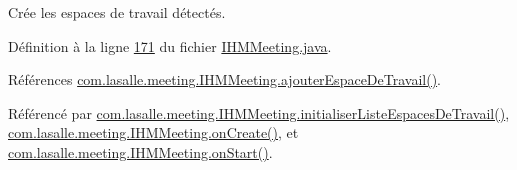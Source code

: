 Crée les espaces de travail détectés. 



Définition à la ligne \hyperlink{_i_h_m_meeting_8java_source_l00171}{171} du fichier \hyperlink{_i_h_m_meeting_8java_source}{I\+H\+M\+Meeting.\+java}.



Références \hyperlink{_i_h_m_meeting_8java_source_l00199}{com.\+lasalle.\+meeting.\+I\+H\+M\+Meeting.\+ajouter\+Espace\+De\+Travail()}.



Référencé par \hyperlink{_i_h_m_meeting_8java_source_l00263}{com.\+lasalle.\+meeting.\+I\+H\+M\+Meeting.\+initialiser\+Liste\+Espaces\+De\+Travail()}, \hyperlink{_i_h_m_meeting_8java_source_l00060}{com.\+lasalle.\+meeting.\+I\+H\+M\+Meeting.\+on\+Create()}, et \hyperlink{_i_h_m_meeting_8java_source_l00114}{com.\+lasalle.\+meeting.\+I\+H\+M\+Meeting.\+on\+Start()}.



